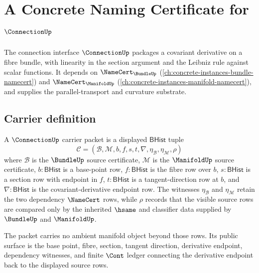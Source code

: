 \chapter{A Concrete Naming Certificate for $\ConnectionUp$}
\label{ch:concrete-instances-connection-namecert}

The connection interface $\ConnectionUp$ packages a covariant derivative on a fibre bundle, with linearity in the section argument and the Leibniz rule against scalar functions. It depends on $\NameCert_{\BundleUp}$ (\autoref{ch:concrete-instances-bundle-namecert}) and $\NameCert_{\ManifoldUp}$ (\autoref{ch:concrete-instances-manifold-namecert}), and supplies the parallel-transport and curvature substrate.

\section{Carrier definition}
\label{sec:connection-carrier}

\begin{definition}
\label{def:connection-carrier-packet}
A $\ConnectionUp$ carrier packet is a displayed $\mathsf{BHist}$ tuple
$$
\mathcal{C}=(\mathcal{B},\mathcal{M},b,f,s,t,\nabla,\eta_{\mathcal{B}},\eta_{\mathcal{M}},\rho)
$$
where $\mathcal{B}$ is the $\BundleUp$ source certificate, $\mathcal{M}$ is the $\ManifoldUp$ source certificate, $b:\mathsf{BHist}$ is a base-point row, $f:\mathsf{BHist}$ is the fibre row over $b$, $s:\mathsf{BHist}$ is a section row with endpoint in $f$, $t:\mathsf{BHist}$ is a tangent-direction row at $b$, and $\nabla:\mathsf{BHist}$ is the covariant-derivative endpoint row. The witnesses $\eta_{\mathcal{B}}$ and $\eta_{\mathcal{M}}$ retain the two dependency $\NameCert$ rows, while $\rho$ records that the visible source rows are compared only by the inherited $\hsame$ and classifier data supplied by $\BundleUp$ and $\ManifoldUp$.

The packet carries no ambient manifold object beyond those rows. Its public surface is the base point, fibre, section, tangent direction, derivative endpoint, dependency witnesses, and finite $\Cont$ ledger connecting the derivative endpoint back to the displayed source rows.
\end{definition}

